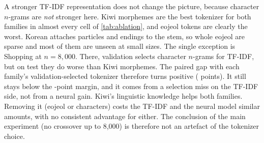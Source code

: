 A stronger TF-IDF representation does not change the picture, because character $n$-grams
are \emph{not} stronger here. Kiwi morphemes are the best tokenizer for both families in
almost every cell of \cref{tab:ablation}, and eojeol tokens are clearly the worst. Korean
attaches particles and endings to the stem, so whole eojeol are sparse and most of them
are unseen at small sizes. The single exception is Shopping at $n=8{,}000$. There,
validation selects character $n$-grams for TF-IDF, but on test they do worse than Kiwi
morphemes. The paired gap with each family's validation-selected tokenizer therefore turns
positive (\ablationGapLargeShopping{} points). It still stays below the
\crossoverMargin-point margin, and it comes from a selection miss on the TF-IDF side, not
from a neural gain. Kiwi's linguistic knowledge helps both families. Removing it (eojeol or
characters) costs the TF-IDF and the neural model similar amounts, with no consistent
advantage for either. The conclusion of the main experiment (no crossover up to 8{,}000) is therefore not
an artefact of the tokenizer choice.
